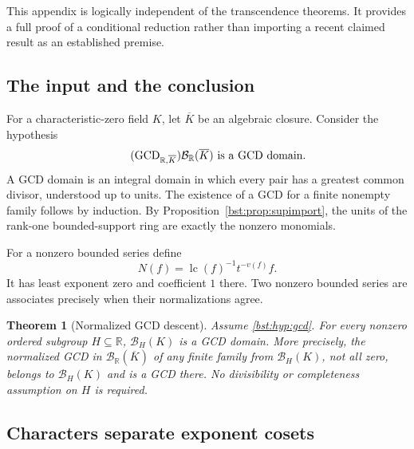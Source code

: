 \documentclass[11pt,letterpaper]{article}
\newtheorem{theorem}{Theorem}[section]
\theoremstyle{definition}
\theoremstyle{remark}
\newcommand{\R}{\mathbb R}
\newcommand{\lc}{\operatorname{lc}}
\newcommand{\BB}[2]{\mathcal B_{#2}(#1)}
\begin{document}
This appendix is logically independent of the transcendence theorems. It
provides a full proof of a conditional reduction rather than importing a
recent claimed result as an established premise.

\subsection{The input and the conclusion}

For a characteristic-zero field $K$, let $\overline K$ be an algebraic
closure. Consider the hypothesis
\begin{equation*}\tag{GCD$_{\R,\overline K}$}\label{bst:hyp:gcd}
 \BB{\overline K}{\R}\text{ is a GCD domain}.
\end{equation*}
A GCD domain is an integral domain in which every pair has a greatest common
divisor, understood up to units. The existence of a GCD for a finite
nonempty family follows by induction. By
Proposition~\ref{bst:prop:supimport}, the units of the rank-one bounded-support
ring are exactly the nonzero monomials.

For a nonzero bounded series define
\begin{equation}\label{bst:eq:normalize}
 N(f)=\lc(f)^{-1}t^{-v(f)}f.
\end{equation}
It has least exponent zero and coefficient $1$ there. Two nonzero bounded
series are associates precisely when their normalizations agree.

\begin{theorem}[Normalized GCD descent]\label{bst:thm:gcddescent}
Assume \eqref{bst:hyp:gcd}. For every nonzero ordered subgroup $H\subseteq\R$,
$\BB KH$ is a GCD domain. More precisely, the normalized GCD in
$\BB{\overline K}{\R}$ of any finite family from $\BB KH$, not all zero,
belongs to $\BB KH$ and is a GCD there. No divisibility or completeness
assumption on $H$ is required.
\end{theorem}

\subsection{Characters separate exponent cosets}
\end{document}

